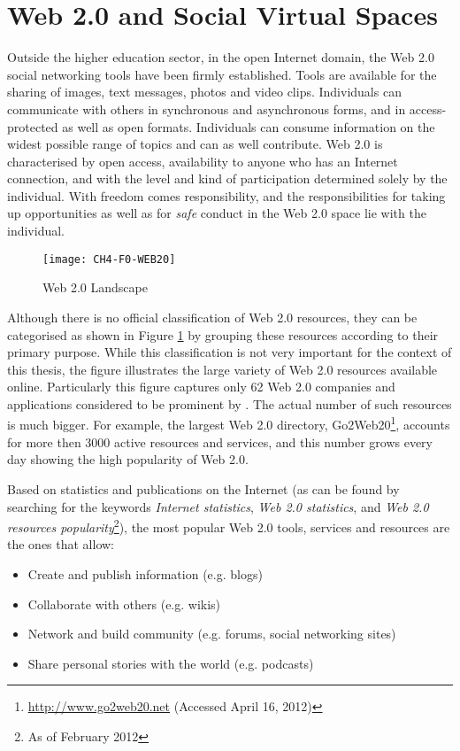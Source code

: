 \section{Web 2.0 and Social Virtual Spaces}
Outside the higher education sector, in the open Internet domain, the Web 2.0
social networking tools have been firmly established. Tools are available for
the sharing of images, text messages, photos and video clips. Individuals can
communicate with others in synchronous and asynchronous forms, and in
access-protected as well as open formats. Individuals can consume information on
the widest possible range of topics and can as well contribute. Web 2.0 is
characterised by open access, availability to anyone who has an Internet
connection, and with the level and kind of participation determined solely by
the individual. With freedom comes responsibility, and the responsibilities for
taking up opportunities as well as for \textit{safe} conduct in the Web 2.0
space lie with the individual.

\begin{figure}[htb]
\centering
\texttt{[image: CH4-F0-WEB20]}
\caption[Web 2.0 Landscape]{Web 2.0 Landscape \citep{Dawson2007}}
\label{fig:web20l}
\end{figure}

Although there is no official classification of Web 2.0 resources, they can be
categorised as shown in Figure \ref{fig:web20l} by grouping these resources
according to their primary purpose. While this classification is not very
important for the context of this thesis, the figure illustrates the large
variety of Web 2.0 resources available online. Particularly this figure captures
only 62 Web 2.0 companies and applications considered to be prominent by
\citet{Dawson2007}. The actual number of such resources is much bigger. For
example, the largest Web 2.0 directory,
Go2Web20\footnote{\url{http://www.go2web20.net} (Accessed April 16, 2012)},
accounts for more then 3000 active resources and services, and this number grows every day showing the high
popularity of Web 2.0.

Based on statistics and publications on the Internet (as can be found by
searching for the keywords \textit{Internet statistics}, \textit{Web 2.0 statistics}, and \textit{Web 2.0
resources popularity}\footnote{As of February 2012}), the most popular Web 2.0
tools, services and resources are the ones that allow:

\begin{itemize}
  \item Create and publish information (e.g. blogs) 
  \item Collaborate with others (e.g. wikis)
  \item Network and build community (e.g. forums, social networking sites)
  \item Share personal stories with the world (e.g. podcasts)
\end{itemize}


